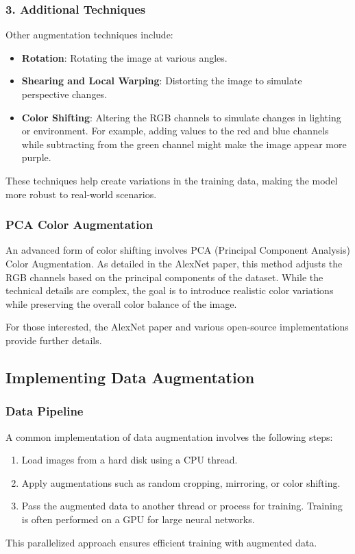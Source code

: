 \documentclass[letterpaper,12pt,notitlepage,twoside]{report}
\begin{document}
\subsubsection*{3. Additional Techniques}
Other augmentation techniques include:
\begin{itemize}
    \item \textbf{Rotation}: Rotating the image at various angles.
    \item \textbf{Shearing and Local Warping}: Distorting the image to simulate perspective changes.
    \item \textbf{Color Shifting}: Altering the RGB channels to simulate changes in lighting or environment. For example, adding values to the red and blue channels while subtracting from the green channel might make the image appear more purple.
\end{itemize}

These techniques help create variations in the training data, making the model more robust to real-world scenarios.

\subsubsection*{PCA Color Augmentation}
An advanced form of color shifting involves PCA (Principal Component Analysis) Color Augmentation. As detailed in the AlexNet paper, this method adjusts the RGB channels based on the principal components of the dataset. While the technical details are complex, the goal is to introduce realistic color variations while preserving the overall color balance of the image.

For those interested, the AlexNet paper and various open-source implementations provide further details.

\subsection*{Implementing Data Augmentation}
\subsubsection*{Data Pipeline}
A common implementation of data augmentation involves the following steps:
\begin{enumerate}
    \item Load images from a hard disk using a CPU thread.
    \item Apply augmentations such as random cropping, mirroring, or color shifting.
    \item Pass the augmented data to another thread or process for training. Training is often performed on a GPU for large neural networks.
\end{enumerate}
This parallelized approach ensures efficient training with augmented data.
\end{document}
